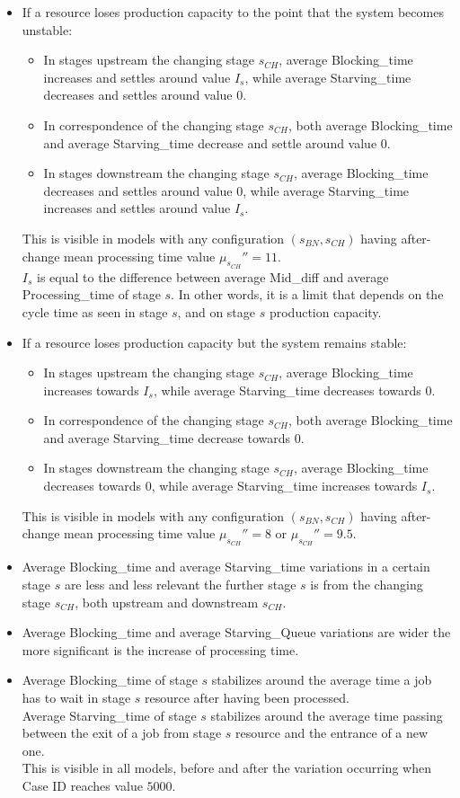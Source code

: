 \begin{itemize}
\item If a resource loses production capacity to the point that the system becomes unstable:
\begin{itemize}
\item In stages upstream the changing stage $s_{CH}$, average Blocking\_time increases and settles around value $I_s$, while average Starving\_time decreases and settles around value $0$.
\item In correspondence of the changing stage $s_{CH}$, both average Blocking\_time and average Starving\_time decrease and settle around value $0$.
\item In stages downstream the changing stage $s_{CH}$, average Blocking\_time decreases and settles around value $0$, while average Starving\_time increases and settles around value $I_s$.
\end{itemize}
This is visible in models with any configuration $(s_{BN},s_{CH})$ having after-change mean processing time value $\mu_{s_{CH}}''=11$.\\
$I_s$ is equal to the difference between average Mid\_diff and average Processing\_time of stage $s$. In other words, it is a limit that depends on the cycle time as seen in stage $s$, and on stage $s$ production capacity. 
\item If a resource loses production capacity but the system remains stable:
\begin{itemize}
\item In stages upstream the changing stage $s_{CH}$, average Blocking\_time increases towards $I_s$, while average Starving\_time decreases towards $0$.
\item In correspondence of the changing stage $s_{CH}$, both average Blocking\_time and average Starving\_time decrease towards $0$.
\item In stages downstream the changing stage $s_{CH}$, average Blocking\_time decreases towards $0$, while average Starving\_time increases towards $I_s$.
\end{itemize}
This is visible in models with any configuration $(s_{BN},s_{CH})$ having after-change mean processing time value $\mu_{s_{CH}}''=8$ or $\mu_{s_{CH}}''=9.5$.
\item Average Blocking\_time and average Starving\_time variations in a certain stage $s$ are less and less relevant the further stage $s$ is from the changing stage $s_{CH}$, both upstream and downstream $s_{CH}$. 
\item Average Blocking\_time and average Starving\_Queue variations are wider the more significant is the increase of processing time.
\item Average Blocking\_time of stage $s$ stabilizes around the average time a job has to wait in stage $s$ resource after having been processed. \\Average Starving\_time of stage $s$ stabilizes around the average time passing between the exit of a job from stage $s$ resource and the entrance of a new one. \\This is visible in all models, before and after the variation occurring when Case ID reaches value $5000$.
\end{itemize}

